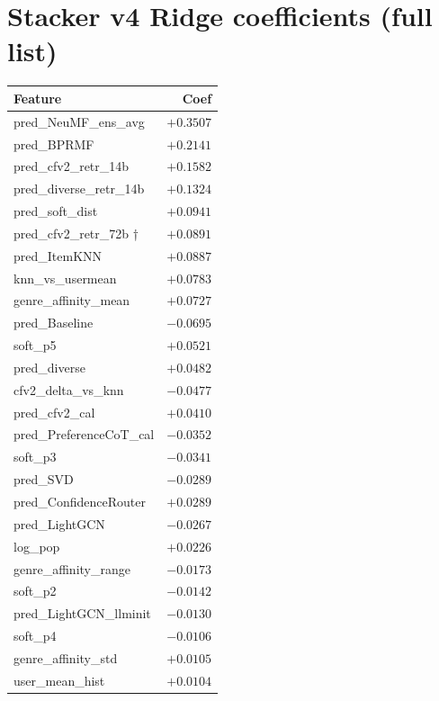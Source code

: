 \documentclass[11pt,a4paper]{article}
\newcommand{\best}[1]{\textcolor{goodgreen}{\textbf{#1}}}
\newcommand{\worst}[1]{\textcolor{badred}{#1}}
\begin{document}
\section{Stacker v4 Ridge coefficients (full list)}
\label{app:v4_coefs}
\begin{table}[H]
\centering
\small
\begin{tabular}{lr}
\toprule
Feature & Coef \\ \midrule
pred\_NeuMF\_ens\_avg        & \best{$+0.3507$} \\
pred\_BPRMF                  & $+0.2141$ \\
pred\_cfv2\_retr\_14b        & $+0.1582$ \\
pred\_diverse\_retr\_14b     & $+0.1324$ \\
pred\_soft\_dist             & $+0.0941$ \\
pred\_cfv2\_retr\_72b †      & $+0.0891$ \\
pred\_ItemKNN                & $+0.0887$ \\
knn\_vs\_usermean            & $+0.0783$ \\
genre\_affinity\_mean        & \best{$+0.0727$} \\
pred\_Baseline               & \worst{$-0.0695$} \\
soft\_p5                     & $+0.0521$ \\
pred\_diverse                & $+0.0482$ \\
cfv2\_delta\_vs\_knn         & $-0.0477$ \\
pred\_cfv2\_cal              & $+0.0410$ \\
pred\_PreferenceCoT\_cal     & $-0.0352$ \\
soft\_p3                     & $-0.0341$ \\
pred\_SVD                    & $-0.0289$ \\
pred\_ConfidenceRouter       & $+0.0289$ \\
pred\_LightGCN               & $-0.0267$ \\
log\_pop                     & $+0.0226$ \\
genre\_affinity\_range       & $-0.0173$ \\
soft\_p2                     & $-0.0142$ \\
pred\_LightGCN\_llminit      & $-0.0130$ \\
soft\_p4                     & $-0.0106$ \\
genre\_affinity\_std         & $+0.0105$ \\
user\_mean\_hist             & $+0.0104$ \\

\end{tabular}
\end{table}
\end{document}
